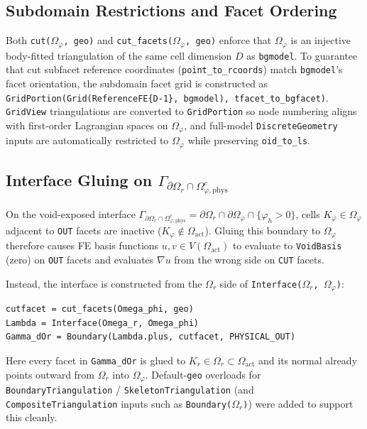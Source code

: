 \documentclass[11pt,a4paper]{article}
\begin{document}
\subsection{Subdomain Restrictions and Facet Ordering}
Both \texttt{cut($\Omega_\varphi$, geo)} and \texttt{cut\_facets($\Omega_\varphi$, geo)} enforce that $\Omega_\varphi$ is an injective body-fitted triangulation of the same cell dimension $D$ as \texttt{bgmodel}. To guarantee that cut subfacet reference coordinates (\texttt{point\_to\_rcoords}) match \texttt{bgmodel}'s facet orientation, the subdomain facet grid is constructed as \texttt{GridPortion(Grid(ReferenceFE\{D-1\}, bgmodel), tfacet\_to\_bgfacet)}. \texttt{GridView} triangulations are converted to \texttt{GridPortion} so node numbering aligns with first-order Lagrangian spaces on $\Omega_\varphi$, and full-model \texttt{DiscreteGeometry} inputs are automatically restricted to $\Omega_\varphi$ while preserving \texttt{oid\_to\_ls}.

\subsection{Interface Gluing on $\Gamma_{\partial \Omega_r \cap \Omega_{\varphi,\mathrm{phys}}^c}$}
On the void-exposed interface $\Gamma_{\partial \Omega_r \cap \Omega_{\varphi,\mathrm{phys}}^c} = \partial \Omega_r \cap \partial \Omega_\varphi \cap \{\varphi_h > 0\}$, cells $K_\varphi \in \Omega_\varphi$ adjacent to \texttt{OUT} facets are inactive ($K_\varphi \notin \Omega_{\mathrm{act}}$). Gluing this boundary to $\Omega_\varphi$ therefore causes FE basis functions $u, v \in V(\Omega_{\mathrm{act}})$ to evaluate to \texttt{VoidBasis} (zero) on \texttt{OUT} facets and evaluates $\nabla u$ from the wrong side on \texttt{CUT} facets.

Instead, the interface is constructed from the $\Omega_r$ side of \texttt{Interface($\Omega_r$, $\Omega_\varphi$)}:
\begin{lstlisting}
cutfacet = cut_facets(Omega_phi, geo)
Lambda = Interface(Omega_r, Omega_phi)
Gamma_dOr = Boundary(Lambda.plus, cutfacet, PHYSICAL_OUT)
\end{lstlisting}
Here every facet in \texttt{Gamma\_dOr} is glued to $K_r \in \Omega_r \subset \Omega_{\mathrm{act}}$ and its normal already points outward from $\Omega_r$ into $\Omega_\varphi$. Default-\texttt{geo} overloads for \texttt{BoundaryTriangulation} / \texttt{SkeletonTriangulation} (and \texttt{CompositeTriangulation} inputs such as \texttt{Boundary($\Omega_r$)}) were added to support this cleanly.
\end{document}
